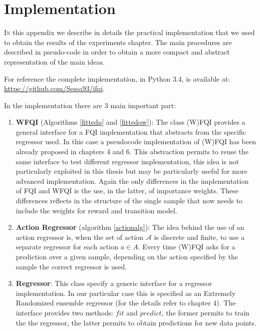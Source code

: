 \chapter{Implementation}

  \lettrine[lines=2]{I}n this appendix we describe in details the practical implementation that we used to obtain the results
  of the experiments chapter. The main procedures are described in pseudo-code in order to obtain a more compact and abstract
  representation of the main ideas.\newline

  \noindent For reference the complete implementation, in Python 3.4, is available at: \newline \url{https://github.com/Sessa93/ifqi}. \newline

  \noindent In the implementation there are 3 main important part:

  \begin{enumerate}
    \item \textbf{WFQI} (Algorithms \ref{fittedq} and \ref{fittedqw}): The class (W)FQI provides a general interface for a FQI implementation that abstracts
      from the specific regressor used. In this case a pseudocode implementation of (W)FQI has been already proposed in chapters 4 and 6.
      This abstraction permits to reuse the same interface to test different regressor implementation, this idea is not particularly
      exploited in this thesis but may be particularly useful for more advanced implementation.\newline
      Again the only differences in the implementation of FQI and WFQI is the use, in the latter, of importance weights. These differences
      reflects in the structure of the single sample that now needs to include the weights for reward and transition model.

    \item \textbf{Action Regressor} (algorithm \ref{actionalg}): The idea behind the use of an action regressor is, when the set of
      action $\mathcal{A}$ is discrete and finite, to use a separate regressor for each action $a \in A$. Every time (W)FQI asks for a prediction
      over a given sample, depending on the action specified by the sample the correct regressor is used.

    \item \textbf{Regressor}: This class specify a generic interface for a regressor implementation. In our particular case this is specified
      as an Extremely Randomized ensemble regressor (for the details refer to chapter 4). The interface provides two methods: $fit$ and $predict$,
      the former permits to train the the regressor, the latter permits to obtain predictions for new data points.
  \end{enumerate}


